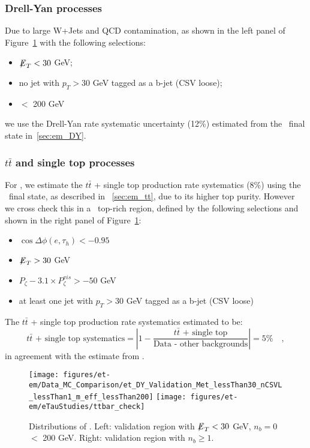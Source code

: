 \subsubsection{Drell-Yan processes}
Due to large W+Jets and QCD contamination, as shown in the left panel of 
Figure~\ref{fig:et_dy_tt} with the following selections:
\begin{itemize}
  \item ${\not\mathrel{E}}_T<30$ GeV;
  \item no jet with $p_T>30$ GeV tagged as a b-jet (CSV loose);
  \item \meffetau $<$ 200 GeV
\end{itemize}
we use the Drell-Yan rate systematic uncertainty (12\%) estimated from
the \tetm ~final state in~\ref{sec:em_DY}.

\subsubsection{$t\bar{t}$ and single top processes}
For \teth, we estimate the $t\bar{t}$ + single top production rate
systematics (8\%) using the \tetm ~final state, as described in
~\ref{sec:em_tt}, due to its higher top purity.  However we cross
check this in a \teth ~top-rich region, defined by the following
selections and shown in the right panel of Figure~\ref{fig:et_dy_tt}:
\begin{itemize}
  \item $\cos{\Delta \phi (e,\tau_{h})}<-0.95$
  \item ${\not\mathrel{E}}_T>30$ GeV
  \item $P_{\zeta}- 3.1 \times P_{\zeta}^{vis} > -50$ GeV
  \item at least one jet with $p_T>30$ GeV tagged as a b-jet (CSV loose)
\end{itemize}
The $t\bar{t}$ + single top production rate systematics estimated to be:
\begin{equation}\label{eq:et_tt}
\text{$t\bar{t}$ + single top systematics} = \left| 1 - \frac{\text{$t\bar{t}$ + single top}}{\text{Data - other backgrounds}}\right| = 5\%\quad,
\end{equation}
in agreement with the estimate from \tetm.

\begin{figure}[thbp!]\centering
  \texttt{[image: figures/et-em/Data\_MC\_Comparison/et\_DY\_Validation\_Met\_lessThan30\_nCSVL\_lessThan1\_m\_eff\_lessThan200]}
  \texttt{[image: figures/et-em/eTauStudies/ttbar\_check]}
  \caption{\label{fig:et_dy_tt} Distributions of \meffetau. Left: validation region with ${\not\mathrel{E}}_T<30$ GeV, $n_b = 0$ \meffetau $<$ 200 GeV.  Right: validation region with $n_b\geq1$.}
\end{figure}

